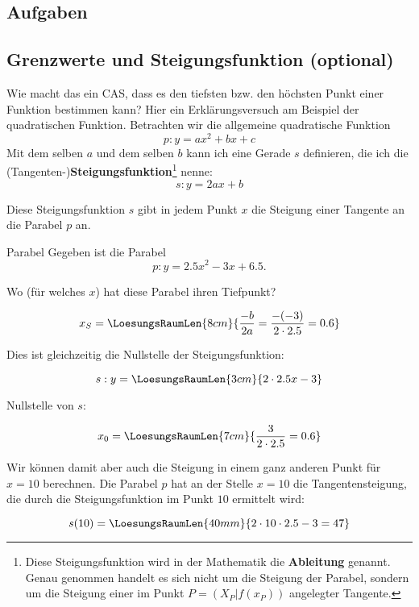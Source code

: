 
\subsection{Aufgaben}
\newpage


\subsection{Grenzwerte und Steigungsfunktion (optional)}

Wie macht das ein CAS, dass es den tiefsten bzw. den höchsten Punkt
einer Funktion bestimmen kann? Hier ein Erklärungsversuch am Beispiel
der quadratischen Funktion.
Betrachten wir die allgemeine quadratische Funktion $$p: y=ax^2 + bx +
c$$
Mit dem selben $a$ und dem selben $b$ kann ich eine Gerade $s$
definieren, die ich die (Tangenten-)\textbf{Steigungsfunktion}\footnote{Diese
  Steigungsfunktion wird in der Mathematik die
  \textbf{Ableitung} genannt. Genau genommen handelt
  es sich nicht um die Steigung der Parabel, sondern um die Steigung
  einer im Punkt $P=(X_P|f(x_P))$ angelegter Tangente.} nenne:
$$s: y= 2ax+b$$
\newpage


Diese Steigungsfunktion $s$ gibt in jedem Punkt $x$ die Steigung einer
Tangente an die Parabel $p$ an.

\begin{beispiel}{Parabel}{}
  Gegeben ist die Parabel $$p: y=2.5x^2 - 3x + 6.5\text{.}$$

  Wo (für welches $x$) hat diese Parabel
  ihren Tiefpunkt? 

  $$x_S =   \LoesungsRaumLen{8cm}{\frac{-b}{2a} = \frac{-(-3)}{2\cdot{}2.5} = 0.6}$$

  Dies ist gleichzeitig die Nullstelle der
  Steigungsfunktion:

  $$s: y= \LoesungsRaumLen{3cm}{2\cdot{}2.5x - 3}$$

  Nullstelle von $s$:

  $$x_0 = \LoesungsRaumLen{7cm}{\frac{3}{2\cdot{}2.5} = 0.6}$$

  Wir können damit aber auch die Steigung in einem ganz anderen Punkt
  \zB für $x=10$ berechnen. Die Parabel $p$ hat an der Stelle $x=10$
  die Tangentensteigung, die durch die Steigungsfunktion im Punkt $10$
  ermittelt wird:

  $$s(10) = \LoesungsRaumLen{40mm}{2\cdot{}10\cdot{2.5} - 3 = 47}$$
  
\end{beispiel}
\newpage

